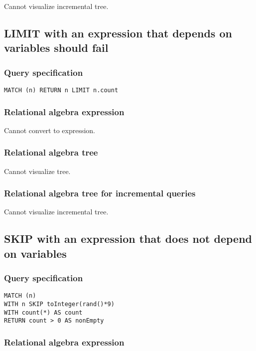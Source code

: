 Cannot visualize incremental tree.

\subsection{LIMIT with an expression that depends on variables should fail}

\subsubsection*{Query specification}

\begin{lstlisting}
MATCH (n) RETURN n LIMIT n.count
\end{lstlisting}

\subsubsection*{Relational algebra expression}

Cannot convert to expression.

\subsubsection*{Relational algebra tree}

Cannot visualize tree.

\subsubsection*{Relational algebra tree for incremental queries}

Cannot visualize incremental tree.

\subsection{SKIP with an expression that does not depend on variables}

\subsubsection*{Query specification}

\begin{lstlisting}
MATCH (n)
WITH n SKIP toInteger(rand()*9)
WITH count(*) AS count
RETURN count > 0 AS nonEmpty
\end{lstlisting}

\subsubsection*{Relational algebra expression}

